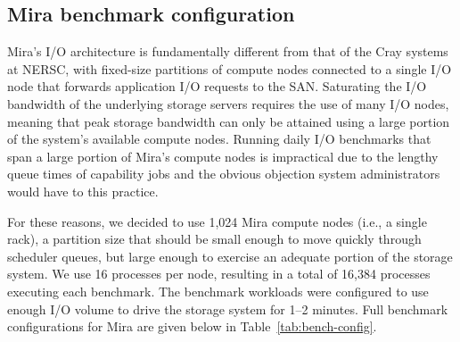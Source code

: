 \subsection{Mira benchmark configuration} \label{sec:platforms/mirabenchmarks}

Mira's I/O architecture is fundamentally different from that of the Cray
systems at NERSC, with fixed-size partitions of compute nodes connected to
a single I/O node that forwards application I/O requests to the SAN.
Saturating the I/O bandwidth of the underlying storage servers requires the
use of many I/O nodes, meaning that peak storage bandwidth can only be
attained using a large portion of the system's available compute nodes.
Running daily I/O benchmarks that span a large portion of Mira's compute
nodes is impractical due to the lengthy queue times of capability jobs and
the obvious objection system administrators would have to this practice.

For these reasons, we decided to use 1,024 Mira compute nodes (i.e., a single
rack), a partition size that should be small enough to move quickly through
scheduler queues, but large enough to exercise an adequate portion of the
storage system. We use 16 processes per node, resulting in a total of 16,384
processes executing each benchmark. The benchmark workloads were configured
to use enough I/O volume to drive the storage system for 1--2 minutes.
Full benchmark configurations for Mira are given below in
Table~\ref{tab:bench-config}.
